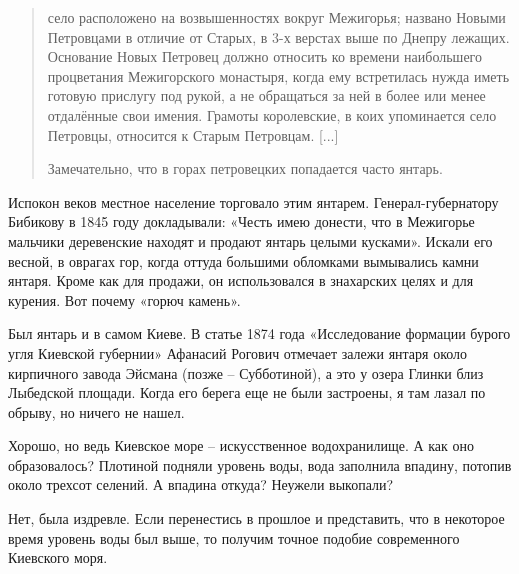 \begin{quotation}
село расположено на возвышенностях вокруг Межигорья; названо Новыми Петровцами в отличие от Старых, в 3-х верстах выше по Днепру лежащих. Основание Новых Петровец должно относить ко времени наибольшего процветания Межигорского монастыря, когда ему встретилась нужда иметь готовую прислугу под рукой, а не обращаться за ней в более или менее отдалённые свои имения. Грамоты королевские, в коих упоминается село Петровцы, относится к Старым Петровцам. [...]


Замечательно, что в горах петровецких попадается часто янтарь.
\end{quotation}

Испокон веков местное население торговало этим янтарем. Генерал-губернатору Бибикову в 1845 году докладывали: «Честь имею донести, что в Межигорье мальчики деревенские находят и продают янтарь целыми кусками». Искали его весной, в оврагах гор, когда оттуда большими обломками вымывались камни янтаря. Кроме как для продажи, он использовался в знахарских целях и для курения. Вот почему «горюч камень».

Был янтарь и в самом Киеве. В статье 1874 года «Исследование формации бурого угля Киевской губернии» Афанасий Рогович отмечает залежи янтаря около кирпичного завода Эйсмана (позже – Субботиной), а это у озера Глинки близ Лыбедской площади. Когда его берега еще не были застроены, я там лазал по обрыву, но ничего не нашел.

Хорошо, но ведь Киевское море – искусственное водохранилище. А как оно образовалось? Плотиной подняли уровень воды, вода заполнила впадину, потопив около трехсот селений. А впадина откуда? Неужели выкопали?

Нет, была издревле. Если перенестись в прошлое и представить, что в некоторое время уровень воды был выше, то получим точное подобие современного Киевского моря.

